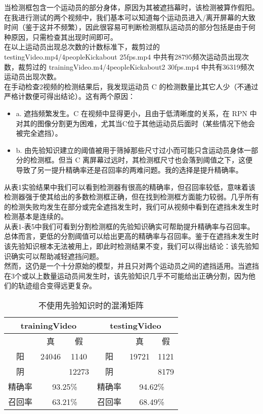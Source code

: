 \documentclass{article}
\begin{document}
当检测框包含一个运动员的部分身体，原因为其被遮挡幕时，该检测被算作假阳。\\
在我进行测试的两个视频中，我们基本可以知道每个运动员进入/离开屏幕的大致时间（鉴于这并不频繁），因此很容易可判断检测框队运动员的部分包括是由于何种原因，只需检查其出现时间即可。\\
在以上运动员出现总次数的计数标准下，裁剪过的 testingVideo.mp4/4peopleKickabout 25fps.mp4 中共有28795频次运动员出现次数，裁剪过的 trainingVideo.m4/4peopleKickabout2 30fps.mp4 中共有36319频次运动员出现次数。\\
在手动检查2视频的检测结果后，我发现运动员 C 的检测数量比其它人少（不通过严格计数便可得出结论）。这有两个原因：
\begin{itemize}
\item a. 遮挡频繁发生。C 在视频中显得更小，且由于低清晰度的关系，在 RPN 中对其的图像分割更为困难，尤其当C位于其他运动员后面时（某些情况下他会被完全遮挡）。
\item b. 由先验知识建立的阈值被用于筛掉那些尺寸过小而可能只含运动员身体一部分的检测框。但当 C 离屏幕过远时，其检测框尺寸也会落到阈值之下，这便导致了另一提升精确率还是召回率的两难问题。我的选择是提升精确率。
\end{itemize}
从表1实验结果中我们可以看到检测器有很高的精确率，但召回率较低，意味着该检测器强于使其给出的多数检测框正确，但在找到检测框方面能力较弱。几乎所有的检测失败均发生在部分或完全遮挡发生时，我们可从视频中看到在遮挡未发生时检测基本是连续的。\\
从表1-表5中我们可看到分割检测框的先验知识确实可帮助提升精确率与召回率。总体而言，更低的分割阈值可以给出更高的精确率与召回率。鉴于在遮挡未发生时该先验知识根本无法被用上，即此时检测结果不变，我们可以得出结论：该先验知识确实可以帮助减轻遮挡问题。\\
然而，这仍是一个十分原始的模型，并且只对两个运动员之间的遮挡适用。当遮挡在3个或以上数量运动员间发生时，该先验知识几乎不可能给出正确分割，因为他们的轨迹组合变得远更复杂。
\begin{table}[]
\centering
\begin{tabular}{|c|c|c|c|c|c|}
\hline
\multicolumn{3}{|c|}{trainingVideo} & \multicolumn{3}{c|}{testingVideo} \\ \hline
 & 真 & 假 &  & 真 & 假 \\ \hline
阳 & 24046 & 1140 & 阳 & 19721 & 1121 \\ \hline
阴 &  & 12273 & 阴 &  & 8179 \\ \hline
精确率 & \multicolumn{2}{c|}{93.25\%} & 精确率 & \multicolumn{2}{c|}{94.62\%} \\ \hline
召回率 & \multicolumn{2}{c|}{63.21\%} & 召回率 & \multicolumn{2}{c|}{68.49\%} \\ \hline
\end{tabular}
\caption{不使用先验知识时的混淆矩阵}
\end{table}
\end{document}
